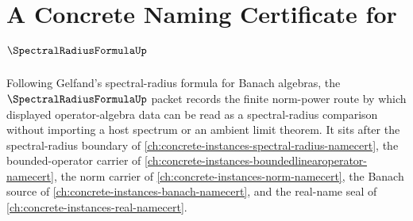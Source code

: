 \chapter{A Concrete Naming Certificate for $\SpectralRadiusFormulaUp$}
\label{ch:concrete-instances-spectral-radius-formula-namecert}

Following Gelfand's spectral-radius formula for Banach algebras, the $\SpectralRadiusFormulaUp$ packet records the finite norm-power route by which displayed operator-algebra data can be read as a spectral-radius comparison without importing a host spectrum or an ambient limit theorem. It sits after the spectral-radius boundary of \autoref{ch:concrete-instances-spectral-radius-namecert}, the bounded-operator carrier of \autoref{ch:concrete-instances-boundedlinearoperator-namecert}, the norm carrier of \autoref{ch:concrete-instances-norm-namecert}, the Banach source of \autoref{ch:concrete-instances-banach-namecert}, and the real-name seal of \autoref{ch:concrete-instances-real-namecert}.

